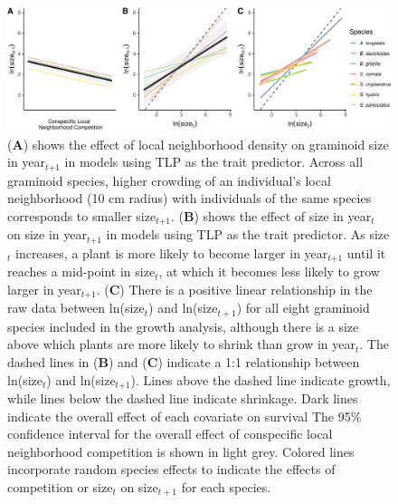 \documentclass[12pt, letterpaper]{article}
\begin{document}
\begin{figure}[h]
  \centering
  \includegraphics[width=1\textwidth]{figures/growthEffectPlots-1.pdf}
  \caption{\internallinenumbers(\textbf{A}) shows the effect of local neighborhood density on graminoid size in year$_\textit{t+1}$ in models using TLP as the trait predictor. Across all graminoid species, higher crowding of an individual’s local neighborhood (10 cm radius) with individuals of the same species corresponds to smaller size$_\textit{t+1}$. (\textbf{B}) shows the effect of size in year$_\textit{t}$ on size in year$_\textit{t+1}$ in models using TLP as the trait predictor. As size$_\textit{t}$ increases, a plant is more likely to become larger in year$_\textit{t+1}$ until it reaches a mid-point in size$_\textit{t}$, at which it becomes less likely to grow larger in year$_\textit{t+1}$. (\textbf{C}) There is a positive linear relationship in the raw data between ln(size$_\textit{t}$) and ln(size$_{t+1}$) for all eight graminoid species included in the growth analysis, although there is a size above which plants are more likely to shrink than grow in year$_\textit{t}$. The dashed lines in (\textbf{B}) and (\textbf{C}) indicate a 1:1 relationship between ln(size$_\textit{t}$) and ln(size$_\textit{t+1}$). Lines above the dashed line indicate growth, while lines below the dashed line indicate shrinkage. Dark lines indicate the overall effect of each covariate on survival The 95\% confidence interval for the overall effect of conspecific local neighborhood competition is shown in light grey. Colored lines incorporate random species effects to indicate the effects of competition or size$_{t}$ on size$_{t+1}$ for each species. 
  }
  \label{fig:Effects_Growth}
\end{figure}
\end{document}
